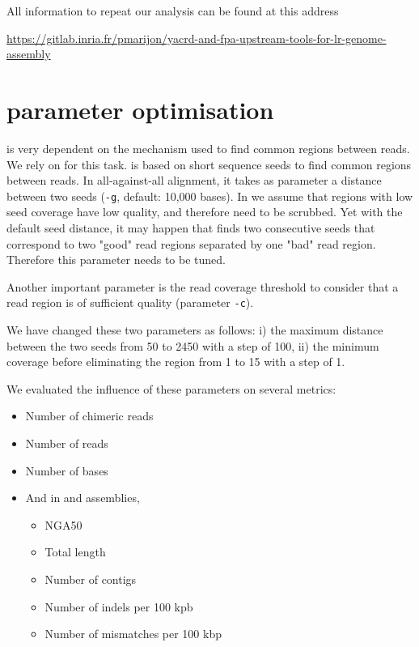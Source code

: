 \documentclass[./main.tex]{subfiles}
\begin{document}
All information to repeat our analysis can be found at this address

\url{https://gitlab.inria.fr/pmarijon/yacrd-and-fpa-upstream-tools-for-lr-genome-assembly}



\newpage
\section{\yacrd parameter optimisation}\label{appendix:yacrd_parameter_optimisation}

\yacrd is very dependent on the mechanism used to find common regions between reads. We rely on \minimap for this task. \minimap is based on short sequence seeds to find common regions between reads. In all-against-all alignment, it takes as parameter a distance between two seeds (\texttt{-g}, default: 10,000 bases). In \yacrd we assume that regions with low seed coverage have low quality, and therefore need to be scrubbed. Yet with the default seed distance, it may happen that \minimap finds two consecutive seeds that correspond to two "good" read regions separated by one "bad" read region. Therefore this parameter needs to be tuned.

Another important parameter is the read coverage threshold to consider that a read region is of sufficient quality (\yacrd parameter \texttt{-c}).

We have changed these two parameters as follows: i) the maximum distance between the two seeds from 50 to 2450 with a step of 100, ii) the minimum coverage before eliminating the region from 1 to 15 with a step of 1.

We evaluated the influence of these parameters on several metrics:
\begin{itemize}
    \item Number of chimeric reads
    \item Number of reads
    \item Number of bases
    \item And in \miniasm and \wtdbg assemblies,
    \begin{itemize}
        \item NGA50
        \item Total length
        \item Number of contigs
        \item Number of indels per 100 kpb
        \item Number of mismatches per 100 kbp
    \end{itemize}
\end{itemize}
\end{document}
